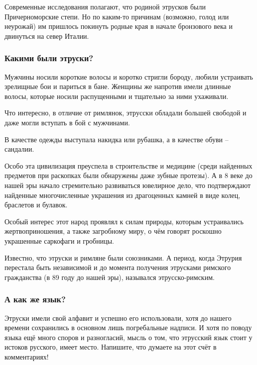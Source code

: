 Современные исследования полагают, что родиной этрусков были Причерноморские
степи. Но по каким-то причинам (возможно, голод или неурожай) им пришлось
покинуть родные края в начале бронзового века и двинуться на север Италии.

\subsubsection{Какими были этруски?}

Мужчины носили короткие волосы и коротко стригли бороду, любили устраивать
зрелищные бои и париться в бане. Женщины же напротив имели длинные волосы,
которые носили распущенными и тщательно за ними ухаживали. 

\begin{zznagolos}
Что интересно, в отличие от римлянок, этрусски обладали большей свободой и даже
могли вступать в бой с мужчинами.
\end{zznagolos}

В качестве одежды выступала накидка или рубашка, а в качестве обуви – сандалии.

Особо эта цивилизация преуспела в строительстве и медицине (среди найденных
предметов при раскопках были обнаружены даже зубные протезы). А в 8 веке до
нашей эры начало стремительно развиваться ювелирное дело, что подтверждают
найденные многочисленные украшения из драгоценных камней в виде колец,
браслетов и булавок.


Особый интерес этот народ проявлял к силам природы, которым устраивались
жертвоприношения, а также загробному миру, о чём говорят роскошно украшенные
саркофаги и гробницы.

Известно, что этруски и римляне были союзниками. А период, когда Этрурия
перестала быть независимой и до момента получения этрусками римского
гражданства (в 89 году до нашей эры), назывался этрусско-римским.

\subsubsection{А как же язык?}

Этруски имели свой алфавит и успешно его использовали, хотя до нашего времени
сохранились в основном лишь погребальные надписи. И хотя по поводу языка ещё
много споров и разногласий, мысль о том, что этрусский язык стоит у истоков
русского, имеет место. Напишите, что думаете на этот счёт в комментариях!

